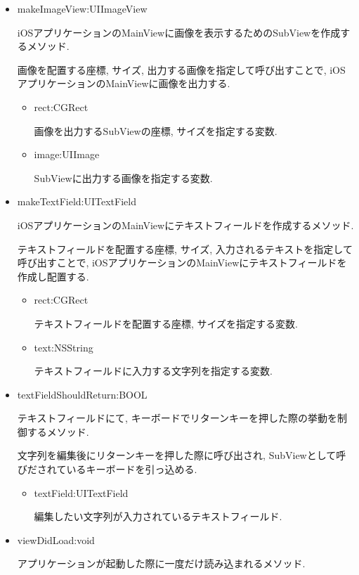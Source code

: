 \begin{itemize}
\begin{itemize}
\item makeImageView:UIImageView

iOSアプリケーションのMainViewに画像を表示するためのSubViewを作成するメソッド.

画像を配置する座標, サイズ, 出力する画像を指定して呼び出すことで, iOSアプリケーションのMainViewに画像を出力する.

\begin{itemize}
\item rect:CGRect

画像を出力するSubViewの座標, サイズを指定する変数.

\item image:UIImage

SubViewに出力する画像を指定する変数.
\end{itemize}

\item makeTextField:UITextField

iOSアプリケーションのMainViewにテキストフィールドを作成するメソッド.

テキストフィールドを配置する座標, サイズ, 入力されるテキストを指定して呼び出すことで, iOSアプリケーションのMainViewにテキストフィールドを作成し配置する.

\begin{itemize}
\item rect:CGRect

テキストフィールドを配置する座標, サイズを指定する変数.

\item text:NSString

テキストフィールドに入力する文字列を指定する変数.
\end{itemize}

\item textFieldShouldReturn:BOOL

テキストフィールドにて, キーボードでリターンキーを押した際の挙動を制御するメソッド.

文字列を編集後にリターンキーを押した際に呼び出され, SubViewとして呼びだされているキーボードを引っ込める.

\begin{itemize}
\item textField:UITextField

編集したい文字列が入力されているテキストフィールド.
\end{itemize}

\item viewDidLoad:void

アプリケーションが起動した際に一度だけ読み込まれるメソッド.


\end{itemize}
\end{itemize}
